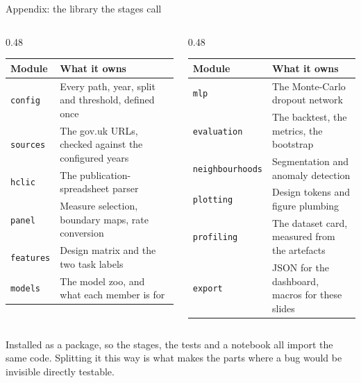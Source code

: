 \documentclass[aspectratio=169,11pt]{beamer}
\newcommand{\smallcap}[1]{{\footnotesize\color{inktwo}#1}}
\begin{document}
\begin{frame}{Appendix: the library the stages call}
  \scriptsize
  \begin{columns}[T,onlytextwidth]
    \begin{column}{0.48\textwidth}
      \begin{tabular}{@{}l>{\raggedright\arraybackslash}p{}@{}}
        \toprule
        \textbf{Module} & \textbf{What it owns} \\
        \midrule
        \texttt{config}    & Every path, year, split and threshold, defined once \\
        \texttt{sources}   & The gov.uk URLs, checked against the configured years \\
        \texttt{hclic}     & The publication-spreadsheet parser \\
        \texttt{panel}     & Measure selection, boundary maps, rate conversion \\
        \texttt{features}  & Design matrix and the two task labels \\
        \texttt{models}    & The model zoo, and what each member is for \\
        \bottomrule
      \end{tabular}
    \end{column}
    \begin{column}{0.48\textwidth}
      \begin{tabular}{@{}l>{\raggedright\arraybackslash}p{}@{}}
        \toprule
        \textbf{Module} & \textbf{What it owns} \\
        \midrule
        \texttt{mlp}            & The Monte-Carlo dropout network \\
        \texttt{evaluation}     & The backtest, the metrics, the bootstrap \\
        \texttt{neighbourhoods} & Segmentation and anomaly detection \\
        \texttt{plotting}       & Design tokens and figure plumbing \\
        \texttt{profiling}      & The dataset card, measured from the artefacts \\
        \texttt{export}         & JSON for the dashboard, macros for these slides \\
        \bottomrule
      \end{tabular}
    \end{column}
  \end{columns}
  \vspace{3mm}

  \smallcap{Installed as a package, so the stages, the tests and a notebook
  all import the same code. Splitting it this way is what makes the parts
  where a bug would be invisible directly testable.}
\end{frame}
\end{document}
